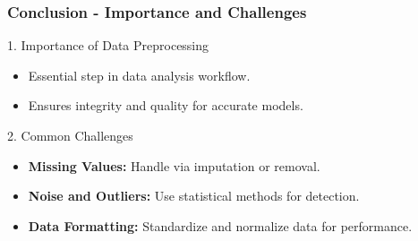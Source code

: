 \documentclass[aspectratio=169]{beamer}
\begin{document}
\begin{frame}[fragile]
    \frametitle{Conclusion - Importance and Challenges}
    \begin{block}{1. Importance of Data Preprocessing}
        \begin{itemize}
            \item Essential step in data analysis workflow.
            \item Ensures integrity and quality for accurate models.
        \end{itemize}
    \end{block}
    
    \begin{block}{2. Common Challenges}
        \begin{itemize}
            \item \textbf{Missing Values:} Handle via imputation or removal.
            \item \textbf{Noise and Outliers:} Use statistical methods for detection.
            \item \textbf{Data Formatting:} Standardize and normalize data for performance.
        \end{itemize}
    \end{block}
\end{frame}
\end{document}
